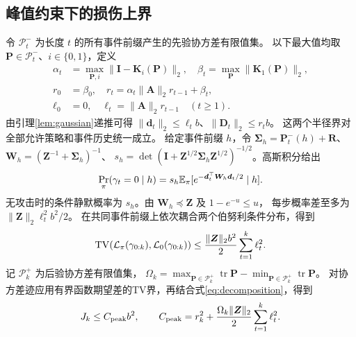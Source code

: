 \subsection{峰值约束下的损伤上界}
令 $\mathcal P_t^-$ 为长度 $t$ 的所有事件前缀产生的先验协方差有限值集。
以下最大值均取 ${\bm{P}}\in\mathcal P_t^-$、$i\in\{0,1\}$，定义
\begin{equation}
 \begin{aligned}
 \alpha_t&=\max_{{\bm{P}},i}\|{\bm{I}}-{\bm{K}}_i({\bm{P}})\|_2,\quad
 \beta_t=\max_{\bm{P}}\|{\bm{K}}_1({\bm{P}})\|_2,\\
 r_0&=\beta_0,\quad r_t=\alpha_t\|{\bm{A}}\|_2r_{t-1}+\beta_t,\\
 \ell_0&=0,\quad \ell_t=\|{\bm{A}}\|_2r_{t-1}\quad(t\ge1).
 \end{aligned}
 \label{eq:radii}
\end{equation}
由引理\ref{lem:gaussian}递推可得 $\|{\bm{d}}_t\|_2\le\ell_tb$、$\|{\bm{D}}_t\|_2\le r_tb$。
这两个半径界对全部允许策略和事件历史统一成立。
给定事件前缀 $h$，令 ${\bm{\Sigma}}_h={\bm{P}}_t^-(h)+{\bm{R}}$、
${\bm{W}}_h=({\bm{Z}}^{-1}+{\bm{\Sigma}}_h)^{-1}$、
$s_h=\det({\bm{I}}+{\bm{Z}}^{1/2}{\bm{\Sigma}}_h{\bm{Z}}^{1/2})^{-1/2}$。高斯积分给出
\begin{equation}
 \Pr_\pi(\gamma_t=0\mid h)
 =s_h\mathbb E_\pi[e^{-{\bm{d}}_t^\top {\bm{W}}_h{\bm{d}}_t/2}\mid h].
 \label{eq:prefix-silence}
\end{equation}
无攻击时的条件静默概率为 $s_h$。由 ${\bm{W}}_h\preceq {\bm{Z}}$ 及 $1-e^{-u}\le u$，
每步概率差至多为 $\|{\bm{Z}}\|_2\ell_t^2b^2/2$。
在共同事件前缀上依次耦合两个伯努利条件分布，得到
\begin{equation}
 \operatorname{TV}(\mathcal L_\pi(\gamma_{0:k}),\mathcal L_0(\gamma_{0:k}))
 \le\frac{\|{\bm{Z}}\|_2b^2}{2}\sum_{t=1}^k\ell_t^2.
 \label{eq:prefix-tv}
\end{equation}
记 $\mathcal P_k^+$ 为后验协方差有限值集，
$\Omega_k=\max_{{\bm{P}}\in\mathcal P_k^+}\operatorname{tr}{\bm{P}}-
\min_{{\bm{P}}\in\mathcal P_k^+}\operatorname{tr}{\bm{P}}$。
对协方差迹应用有界函数期望差的TV界，再结合式\eqref{eq:decomposition}，得到
\begin{equation}
 J_k\le C_{\rm peak}b^2,\qquad
 C_{\rm peak}=r_k^2+\frac{\Omega_k\|{\bm{Z}}\|_2}{2}\sum_{t=1}^k\ell_t^2.
 \label{eq:peak-bound}
\end{equation}

